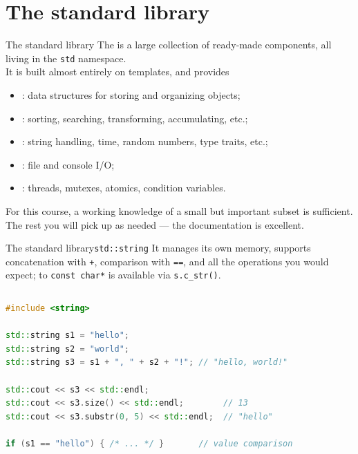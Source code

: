 
\section{The standard library}
\graphicspath{{figs/section2/}}

\begin{frame}{The standard library}
	\justifying
	The  is a large collection of ready-made components, all living in the \texttt{std} namespace.\\
	It is built almost entirely on templates, and provides
	\begin{itemize}
		\item {}: data structures for storing and organizing objects;
		\item {}: sorting, searching, transforming, accumulating, etc.;
		\item {}: string handling, time, random numbers, type traits, etc.;
		\item {}: file and console I/O;
		\item {}: threads, mutexes, atomics, condition variables.
	\end{itemize}
	\bigskip
	For this course, a working knowledge of a small but important subset is sufficient.\\
	The rest you will pick up as needed — the documentation is excellent.
\end{frame}
\begin{frame}[fragile]{The standard library}{\texttt{std::string}}
	\justifying
	It manages its own memory, supports concatenation with \texttt{+}, comparison with \texttt{==}, and all the operations you would expect;  to \texttt{const char*} is available via \texttt{s.c\_str()}.
	\begin{columns}
		\begin{lstlisting}[style=codebeamer, language=C++, caption=Basic \texttt{std::string} usage.]
#include <string>

std::string s1 = "hello";
std::string s2 = "world";
std::string s3 = s1 + ", " + s2 + "!"; // "hello, world!"

std::cout << s3 << std::endl;
std::cout << s3.size() << std::endl;        // 13
std::cout << s3.substr(0, 5) << std::endl;  // "hello"

if (s1 == "hello") { /* ... */ }       // value comparison
    \end{lstlisting}
	\end{columns}
\end{frame}
